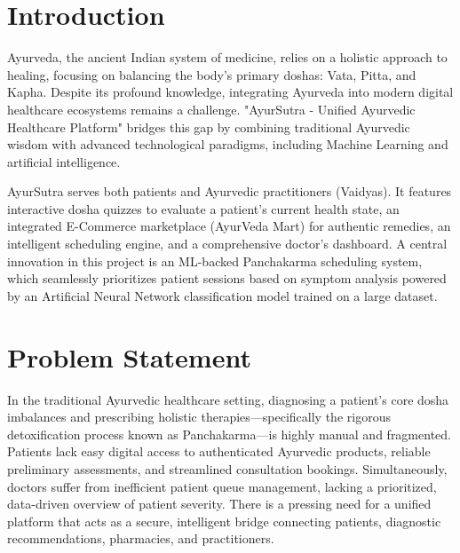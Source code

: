 \documentclass[10pt]{article}
\begin{document}
\large{

\newpage
\tableofcontents

\newpage
\listoffigures

\newpage

\section{Introduction}
Ayurveda, the ancient Indian system of medicine, relies on a holistic approach to healing, focusing on balancing the body's primary doshas: Vata, Pitta, and Kapha. Despite its profound knowledge, integrating Ayurveda into modern digital healthcare ecosystems remains a challenge. "AyurSutra - Unified Ayurvedic Healthcare Platform" bridges this gap by combining traditional Ayurvedic wisdom with advanced technological paradigms, including Machine Learning and artificial intelligence.

AyurSutra serves both patients and Ayurvedic practitioners (Vaidyas). It features interactive dosha quizzes to evaluate a patient's current health state, an integrated E-Commerce marketplace (AyurVeda Mart) for authentic remedies, an intelligent scheduling engine, and a comprehensive doctor's dashboard. A central innovation in this project is an ML-backed Panchakarma scheduling system, which seamlessly prioritizes patient sessions based on symptom analysis powered by an Artificial Neural Network classification model trained on a large dataset.

\newpage
\section{Problem Statement}
In the traditional Ayurvedic healthcare setting, diagnosing a patient's core dosha imbalances and prescribing holistic therapies—specifically the rigorous detoxification process known as Panchakarma—is highly manual and fragmented. Patients lack easy digital access to authenticated Ayurvedic products, reliable preliminary assessments, and streamlined consultation bookings. Simultaneously, doctors suffer from inefficient patient queue management, lacking a prioritized, data-driven overview of patient severity. There is a pressing need for a unified platform that acts as a secure, intelligent bridge connecting patients, diagnostic recommendations, pharmacies, and practitioners.

}
\end{document}
